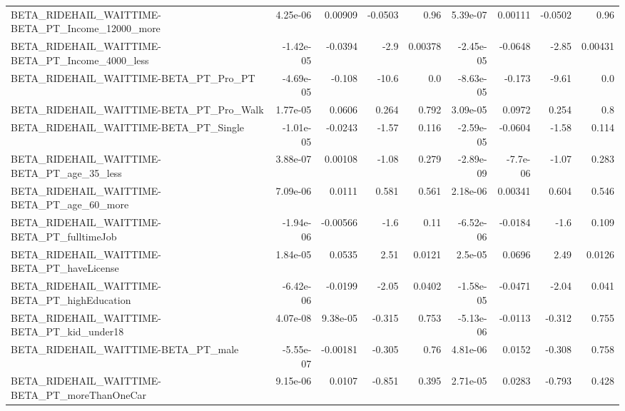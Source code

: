 \begin{tabular}{lrrrrrrrr}
BETA\_RIDEHAIL\_WAITTIME-BETA\_PT\_Income\_12000\_more   &    4.25e-06 &      0.00909 &   -0.0503 &     0.96 &   5.39e-07 &     0.00111 &      -0.0502 &          0.96 \\
BETA\_RIDEHAIL\_WAITTIME-BETA\_PT\_Income\_4000\_less    &   -1.42e-05 &      -0.0394 &      -2.9 &  0.00378 &  -2.45e-05 &     -0.0648 &        -2.85 &       0.00431 \\
BETA\_RIDEHAIL\_WAITTIME-BETA\_PT\_Pro\_PT              &   -4.69e-05 &       -0.108 &     -10.6 &      0.0 &  -8.63e-05 &      -0.173 &        -9.61 &           0.0 \\
BETA\_RIDEHAIL\_WAITTIME-BETA\_PT\_Pro\_Walk            &    1.77e-05 &       0.0606 &     0.264 &    0.792 &   3.09e-05 &      0.0972 &        0.254 &           0.8 \\
BETA\_RIDEHAIL\_WAITTIME-BETA\_PT\_Single              &   -1.01e-05 &      -0.0243 &     -1.57 &    0.116 &  -2.59e-05 &     -0.0604 &        -1.58 &         0.114 \\
BETA\_RIDEHAIL\_WAITTIME-BETA\_PT\_age\_35\_less         &    3.88e-07 &      0.00108 &     -1.08 &    0.279 &  -2.89e-09 &    -7.7e-06 &        -1.07 &         0.283 \\
BETA\_RIDEHAIL\_WAITTIME-BETA\_PT\_age\_60\_more         &    7.09e-06 &       0.0111 &     0.581 &    0.561 &   2.18e-06 &     0.00341 &        0.604 &         0.546 \\
BETA\_RIDEHAIL\_WAITTIME-BETA\_PT\_fulltimeJob         &   -1.94e-06 &     -0.00566 &      -1.6 &     0.11 &  -6.52e-06 &     -0.0184 &         -1.6 &         0.109 \\
BETA\_RIDEHAIL\_WAITTIME-BETA\_PT\_haveLicense         &    1.84e-05 &       0.0535 &      2.51 &   0.0121 &    2.5e-05 &      0.0696 &         2.49 &        0.0126 \\
BETA\_RIDEHAIL\_WAITTIME-BETA\_PT\_highEducation       &   -6.42e-06 &      -0.0199 &     -2.05 &   0.0402 &  -1.58e-05 &     -0.0471 &        -2.04 &         0.041 \\
BETA\_RIDEHAIL\_WAITTIME-BETA\_PT\_kid\_under18         &    4.07e-08 &     9.38e-05 &    -0.315 &    0.753 &  -5.13e-06 &     -0.0113 &       -0.312 &         0.755 \\
BETA\_RIDEHAIL\_WAITTIME-BETA\_PT\_male                &   -5.55e-07 &     -0.00181 &    -0.305 &     0.76 &   4.81e-06 &      0.0152 &       -0.308 &         0.758 \\
BETA\_RIDEHAIL\_WAITTIME-BETA\_PT\_moreThanOneCar      &    9.15e-06 &       0.0107 &    -0.851 &    0.395 &   2.71e-05 &      0.0283 &       -0.793 &         0.428 \\

\end{tabular}
